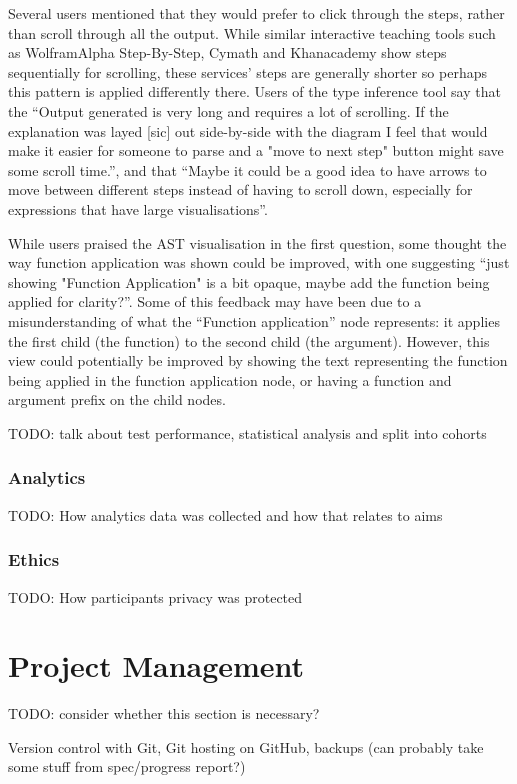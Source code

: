 \documentclass[a4paper,fleqn,12pt]{article}
\begin{document}
Several users mentioned that they would prefer to click through the steps, rather than scroll through all the output. While similar interactive teaching tools such as WolframAlpha Step-By-Step, Cymath and Khanacademy show steps sequentially for scrolling, these services’ steps are generally shorter so perhaps this pattern is applied differently there. Users of the type inference tool say that the “Output generated is very long and requires a lot of scrolling. If the explanation was layed [sic] out side-by-side with the diagram I feel that would make it easier for someone to parse and a "move to next step" button might save some scroll time.”, and that “Maybe it could be a good idea to have arrows to move between different steps instead of having to scroll down, especially for expressions that have large visualisations”.

While users praised the AST visualisation in the first question, some thought the way function application was shown could be improved, with one suggesting “just showing "Function Application" is a bit opaque, maybe add the function being applied for clarity?”. Some of this feedback may have been due to a misunderstanding of what the “Function application” node represents: it applies the first child (the function) to the second child (the argument). However, this view could potentially be improved by showing the text representing the function being applied in the function application node, or having a function and argument prefix on the child nodes.

TODO: talk about test performance, statistical analysis and split into cohorts
\subsubsection{Analytics}\label{id:h.67g05flyfv0z}
TODO: How analytics data was collected and how that relates to aims

\subsubsection{Ethics}\label{id:h.q5st3bb4afm1}
TODO: How participants privacy was protected
\section{Project Management}\label{id:h.3j8xp631ygy}
TODO: consider whether this section is necessary?

Version control with Git, Git hosting on GitHub, backups (can probably take some stuff from spec/progress report?)
\end{document}
